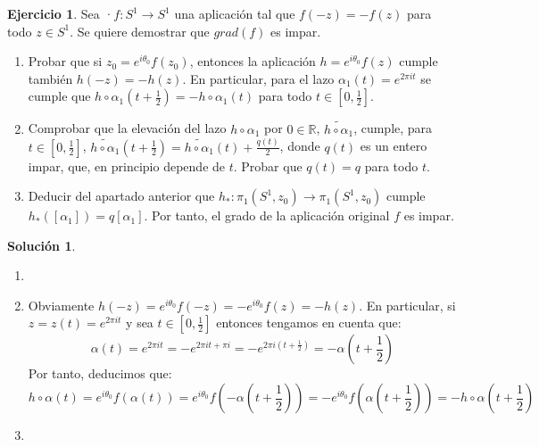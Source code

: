 \documentclass{article}
\theoremstyle{plain}
\theoremstyle{definition}
\newtheorem{exercise}{Ejercicio}
\newtheorem*{sol*}{Solución}
\begin{document}
\newpage

\begin{exercise} \label{grado2} Sea ·$f: S^1\to S^1$ una aplicaci\'on tal que $f(-z) = -f(z)$ para todo $z\in S^1$. Se quiere demostrar que $grad(f)$ es impar.
\begin{enumerate}
\item Probar que si $z_0 = e^{i\theta_0}f(z_0)$, entonces la aplicaci\'on $h = e^{i\theta_0}f(z)$ cumple tambi\'en $h(-z) = -h(z)$. En particular, para el lazo $\alpha_1(t) = e^{2\pi i t}$  se cumple que $h\circ \alpha_1(t+\frac{1}{2}) = -h \circ \alpha_1(t)$ para todo $t\in [0,\frac{1}{2}]$.

\item Comprobar que la elevaci\'on del lazo $h\circ \alpha_1$ por $0\in \mathbb{R}$,
$\widetilde{h\circ \alpha_1}$, cumple, para $t\in [0,\frac{1}{2}]$, $\widetilde{h\circ \alpha_1}(t+\frac{1}{2}) = \widetilde{h\circ \alpha_1}(t) +\frac{q(t)}{2}$, donde $q(t)$ es un entero impar, que, en principio depende de $t$. Probar que $q(t) = q$ para todo $t$.
\item Deducir del apartado anterior que $h_*: \pi_1(S^1,z_0) \to \pi_1(S^1,z_0)$ cumple $h_* ([\alpha_1]) = q [\alpha_1]$. Por tanto, el grado de la aplicaci\'on original $f$ es impar.

\end{enumerate}
\end{exercise}
\begin{sol*}
\begin{enumerate}
\item[]
\item Obviamente $h(-z) = e^{i\theta_0}f(-z) = -e^{i\theta_0}f(z) = -h(z)$. En particular, si $z=z(t)=e^{2\pi i t}$ y sea $t\in [0,\frac{1}{2}]$ entonces tengamos en cuenta que:
\[
\alpha(t) = e^{2\pi i t} = - e^{2\pi i t + \pi i} = -e^{2\pi i \left(t+\frac{1}{2}\right)}=-\alpha\left(t+\frac{1}{2}\right) 
\]
Por tanto, deducimos que:
\[
h\circ \alpha (t) = e^{i\theta_0}f(\alpha(t)) = e^{i\theta_0}f\left(-\alpha\left(t+\frac{1}{2}\right)\right) = -e^{i\theta_0}f\left(\alpha\left(t+\frac{1}{2}\right)\right)=-h\circ \alpha \left(t+\frac{1}{2}\right) 
\]
\item 
\end{enumerate}
\end{sol*}

\newpage
\end{document}
